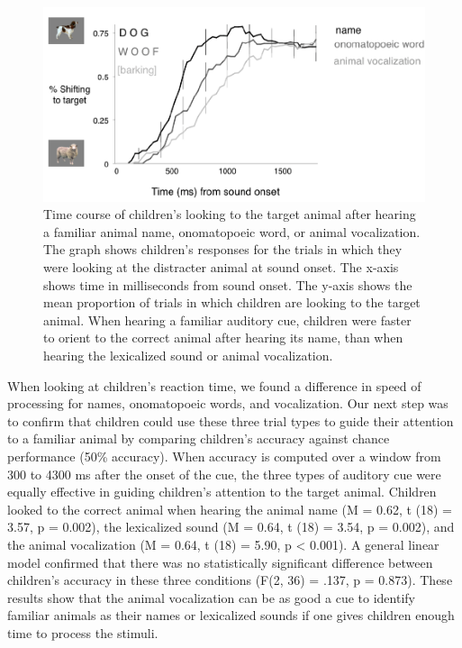\documentclass[english,floatsintext,man]{apa6}
\theoremstyle{definition}
\theoremstyle{definition}
\theoremstyle{definition}
\theoremstyle{remark}
\begin{document}
\begin{figure}
\centering
\includegraphics{anime_manuscript_files/figure-latex/unnamed-chunk-2-1.pdf}
\caption{\label{fig:unnamed-chunk-2}Time course of children's looking to the
target animal after hearing a familiar animal name, onomatopoeic word,
or animal vocalization. The graph shows children's responses for the
trials in which they were looking at the distracter animal at sound
onset. The x-axis shows time in milliseconds from sound onset. The
y-axis shows the mean proportion of trials in which children are looking
to the target animal. When hearing a familiar auditory cue, children
were faster to orient to the correct animal after hearing its name, than
when hearing the lexicalized sound or animal vocalization.}
\end{figure}

When looking at children's reaction time, we found a difference in speed
of processing for names, onomatopoeic words, and vocalization. Our next
step was to confirm that children could use these three trial types to
guide their attention to a familiar animal by comparing children's
accuracy against chance performance (50\% accuracy). When accuracy is
computed over a window from 300 to 4300 ms after the onset of the cue,
the three types of auditory cue were equally effective in guiding
children's attention to the target animal. Children looked to the
correct animal when hearing the animal name (M = 0.62, t (18) = 3.57, p
= 0.002), the lexicalized sound (M = 0.64, t (18) = 3.54, p = 0.002),
and the animal vocalization (M = 0.64, t (18) = 5.90, p \textless{}
0.001). A general linear model confirmed that there was no statistically
significant difference between children's accuracy in these three
conditions (F(2, 36) = .137, p = 0.873). These results show that the
animal vocalization can be as good a cue to identify familiar animals as
their names or lexicalized sounds if one gives children enough time to
process the stimuli.
\end{document}
